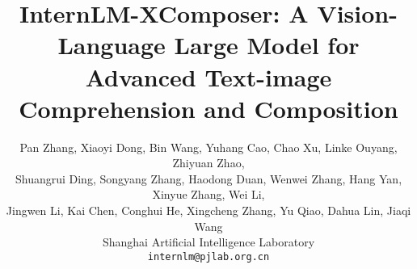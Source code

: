 \documentclass[10pt,twocolumn,letterpaper]{article}
\begin{document}
\title{InternLM-XComposer: A Vision-Language Large Model for \\ Advanced Text-image Comprehension and Composition}

\author{Pan Zhang, Xiaoyi Dong, Bin Wang, Yuhang Cao, Chao Xu, Linke Ouyang, Zhiyuan Zhao, \\ Shuangrui Ding, Songyang Zhang, Haodong Duan, Wenwei Zhang, Hang Yan, Xinyue Zhang, Wei Li, \\ Jingwen Li,
Kai Chen, Conghui He, Xingcheng Zhang, Yu Qiao, Dahua Lin, Jiaqi Wang{\textsuperscript{\Letter}}\\
Shanghai Artificial Intelligence Laboratory \\
\tt\small
internlm@pjlab.org.cn
}

 \maketitle


{\let\thefootnote\relax{}}
\end{document}
